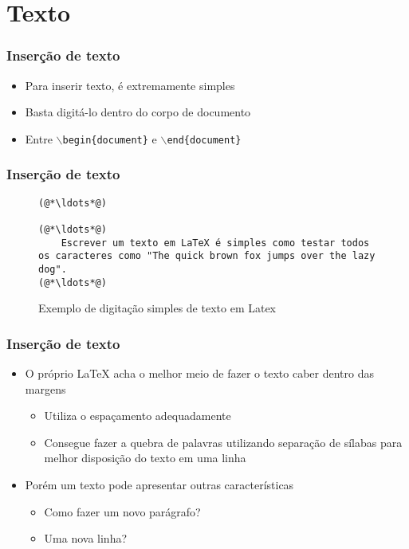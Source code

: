 \section{Texto}

\begin{frame}[fragile] \frametitle{Inserção de texto}
\begin{itemize}
	\item Para inserir texto, é extremamente simples
	\item Basta digitá-lo dentro do corpo de documento
	\item Entre \texttt{$\backslash$begin\{document\}} e \texttt{$\backslash$end\{document\}}
\end{itemize}
\end{frame}

\begin{frame}[fragile] \frametitle{Inserção de texto}
\begin{figure}[!t]
\caption{Exemplo de digitação simples de texto em Latex}
\begin{lstlisting}
(@*\ldots*@)

(@*\ldots*@)
	Escrever um texto em LaTeX é simples como testar todos os caracteres como "The quick brown fox jumps over the lazy dog".
(@*\ldots*@)

\end{lstlisting}
\ownsrc
\end{figure}
\end{frame}

\begin{frame}[fragile] \frametitle{Inserção de texto}
\begin{itemize}
	\item O próprio LaTeX acha o melhor meio de fazer o texto caber dentro das margens
	\begin{itemize}
		\item Utiliza o espaçamento adequadamente
		\item Consegue fazer a quebra de palavras utilizando separação de sílabas para melhor disposição do texto em uma linha
	\end{itemize}
	\item Porém um texto pode apresentar outras características
	\begin{itemize}
		\item Como fazer um novo parágrafo?
		\item Uma nova linha?
	\end{itemize}
\end{itemize}
\end{frame}

